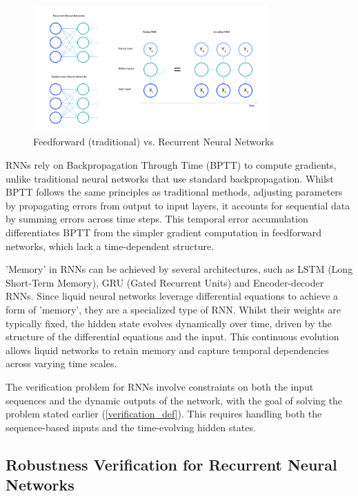 \begin{figure}[h!]
    \centering
    \includegraphics[width=0.8\textwidth]{img/RNN_vs_FeedForward.png}
    \caption{Feedforward (traditional) vs. Recurrent Neural Networks}
    \label{fig:example_image}
\end{figure}

RNNs rely on Backpropagation Through Time (BPTT) to compute gradients, unlike traditional neural networks that use standard backpropagation. Whilst BPTT follows the same principles as traditional methods, adjusting parameters by propagating errors from output to input layers, it accounts for sequential data by summing errors across time steps. This temporal error accumulation differentiates BPTT from the simpler gradient computation in feedforward networks, which lack a time-dependent structure.

'Memory' in RNNs can be achieved by several architectures, such as LSTM (Long Short-Term Memory), GRU (Gated Recurrent Units) and Encoder-decoder RNNs. Since liquid neural networks leverage differential equations to achieve a form of 'memory', they are a specialized type of RNN. Whilst their weights are typically fixed, the hidden state evolves dynamically over time, driven by the structure of the differential equations and the input. This continuous evolution allows liquid networks to retain memory and capture temporal dependencies across varying time scales.

The verification problem for RNNs involve constraints on both the input sequences and the dynamic outputs of the network, with the goal of solving the problem stated earlier (\ref{verification_def}). This requires handling both the sequence-based inputs and the time-evolving hidden states.

\subsection{Robustness Verification for Recurrent Neural Networks}

